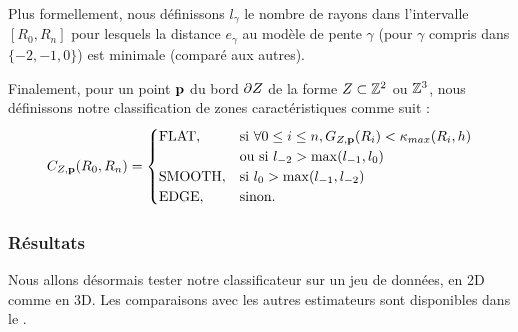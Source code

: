 Plus formellement, nous définissons $l_{\gamma}$ le nombre de rayons dans
l'intervalle $[R_0,R_n]$ pour lesquels la distance $e_\gamma$ au modèle de pente
$\gamma$ (pour $\gamma$ compris dans $\{-2, -1, 0\}$) est minimale (comparé aux
autres).


Finalement, pour un point $\mathbf{p}$ du bord $\partial Z$ de la forme $Z \subset \mathbb{Z}^2$ ou $\mathbb{Z}^3$, nous
définissons notre classification de zones caractéristiques comme suit :
%
\begin{equation}
 C_{Z,\mathbf{p}}(R_0, R_n) =
  \begin{cases}
      \text{FLAT},         & \text{si } \forall 0 \leq i \leq n,    G_{Z,\mathbf{p}}(R_i) < \kappa_{max}(R_i,h) \\
                           & \text{ou si } l_{-2} > \max( l_{-1}, l_{0} )\\
      \text{SMOOTH},       & \text{si } l_{0}> \max( l_{-1}, l_{-2} )\\
      \text{EDGE},        & \text{sinon.}
  \end{cases}
\end{equation}
%
\subsubsection{Résultats}%
\label{sec:applications:feature:II:results}
%
Nous allons désormais tester notre classificateur sur un jeu de données, en 2D comme en
3D. Les comparaisons avec les autres estimateurs sont disponibles dans le
.


